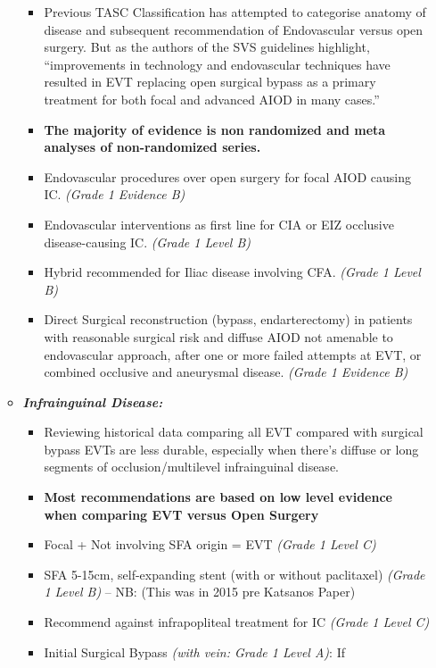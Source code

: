 \documentclass[
]{book}
\begin{document}
\begin{itemize}
\begin{itemize}
    \begin{itemize}
    \item
      Previous TASC Classification has attempted to categorise
      anatomy of disease and subsequent recommendation of
      Endovascular versus open surgery. But as the authors of the
      SVS guidelines highlight, ``improvements in technology and
      endovascular techniques have resulted in EVT replacing open
      surgical bypass as a primary treatment for both focal and
      advanced AIOD in many cases.''
    \item
      \textbf{The majority of evidence is non randomized and meta analyses
      of non-randomized series.}
    \item
      Endovascular procedures over open surgery for focal AIOD
      causing IC. \emph{(Grade 1 Evidence B)}
    \item
      Endovascular interventions as first line for CIA or EIZ
      occlusive disease-causing IC. \emph{(Grade 1 Level B)}
    \item
      Hybrid recommended for Iliac disease involving CFA. \emph{(Grade 1
      Level B)}
    \item
      Direct Surgical reconstruction (bypass, endarterectomy) in
      patients with reasonable surgical risk and diffuse AIOD not
      amenable to endovascular approach, after one or more failed
      attempts at EVT, or combined occlusive and aneurysmal
      disease. \emph{(Grade 1 Evidence B)}
    \end{itemize}
  \item
    \textbf{\emph{Infrainguinal Disease:}}

    \begin{itemize}
    \item
      Reviewing historical data comparing all EVT
      compared with surgical bypass EVTs are less durable,
      especially when there's diffuse or long segments of
      occlusion/multilevel infrainguinal disease.
    \item
      \textbf{Most recommendations are based on low level evidence when
      comparing EVT versus Open Surgery}
    \item
      Focal + Not involving SFA origin = EVT \emph{(Grade 1 Level C)}
    \item
      SFA 5-15cm, self-expanding stent (with or without
      paclitaxel) \emph{(Grade 1 Level B)} -- NB: (This was in 2015 pre
      Katsanos Paper)
    \item
      Recommend against infrapopliteal treatment for IC \emph{(Grade 1
      Level C)}
    \item
      Initial Surgical Bypass \emph{(with vein: Grade 1 Level A)}: If


\end{itemize}
\end{itemize}
\end{itemize}
\end{document}
